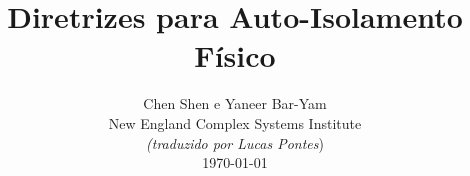 \documentclass[onecolumn,journal]{IEEEtran}
\begin{document}
\title{\color{Brown}  Diretrizes para Auto-Isolamento Físico
\vspace{-0.35ex}}
\author{Chen Shen e Yaneer Bar-Yam \\ New England Complex Systems Institute \\
\vspace{+0.35ex}
\small{\textit{(traduzido por Lucas Pontes})}\\
 \today
  \vspace{-8ex} \\
\textbf{}
 }

\maketitle




\thispagestyle{empty} %





\end{document}
